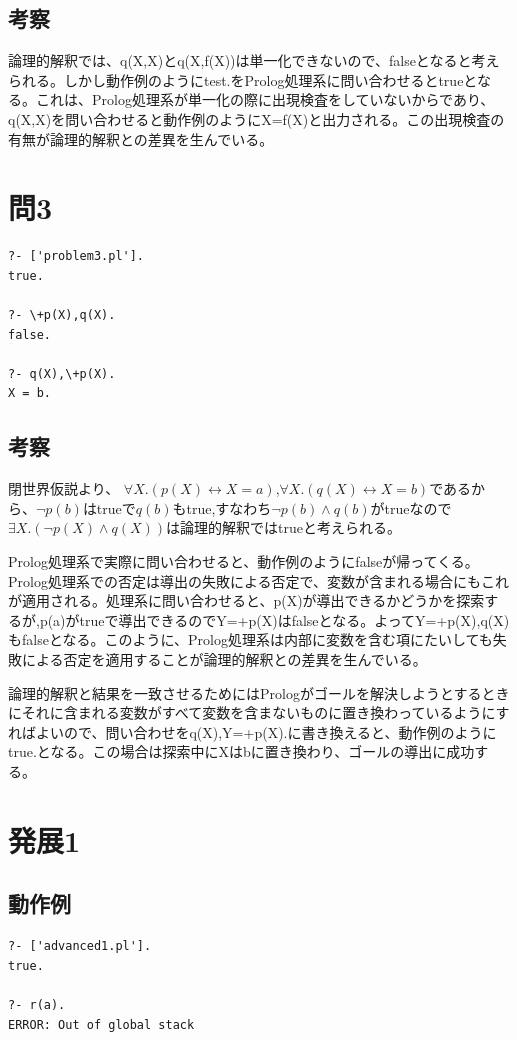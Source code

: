 \documentclass[11pt,a4paper]{jsarticle}
\begin{document}
\subsection*{考察}
論理的解釈では、q(X,X)とq(X,f(X))は単一化できないので、falseとなると考えられる。しかし動作例のようにtest.をProlog処理系に問い合わせるとtrueとなる。これは、Prolog処理系が単一化の際に出現検査をしていないからであり、q(X,X)を問い合わせると動作例のようにX=f(X)と出力される。この出現検査の有無が論理的解釈との差異を生んでいる。
\section*{問3}
\begin{lstlisting}[basicstyle=\ttfamily\footnotesize, frame=single]
?- ['problem3.pl'].
true.

?- \+p(X),q(X).
false.

?- q(X),\+p(X).
X = b.
\end{lstlisting}
\subsection*{考察}
閉世界仮説より、
$\forall X.(p(X) \leftrightarrow X=a)$,$\forall X.(q(X)\leftrightarrow X=b)$であるから、$\lnot p(b)$はtrueで$q(b)$もtrue,すなわち$\lnot p(b) \land q(b)$がtrueなので$\exists X.(\lnot p(X) \land q(X))$は論理的解釈ではtrueと考えられる。\par
Prolog処理系で実際に問い合わせると、動作例のようにfalseが帰ってくる。Prolog処理系での否定は導出の失敗による否定で、変数が含まれる場合にもこれが適用される。処理系に問い合わせると、p(X)が導出できるかどうかを探索するが,p(a)がtrueで導出できるのでY\llap=+p(X)はfalseとなる。よってY\llap=+p(X),q(X)もfalseとなる。このように、Prolog処理系は内部に変数を含む項にたいしても失敗による否定を適用することが論理的解釈との差異を生んでいる。\par
論理的解釈と結果を一致させるためにはPrologがゴールを解決しようとするときにそれに含まれる変数がすべて変数を含まないものに置き換わっているようにすればよいので、問い合わせをq(X),Y\llap=+p(X).に書き換えると、動作例のようにtrue.となる。この場合は探索中にXはbに置き換わり、ゴールの導出に成功する。\\

\section*{発展1}
\subsection*{動作例}
\begin{lstlisting}[basicstyle=\ttfamily\footnotesize, frame=single]
?- ['advanced1.pl'].
true.

?- r(a).
ERROR: Out of global stack
\end{lstlisting}
\end{document}
